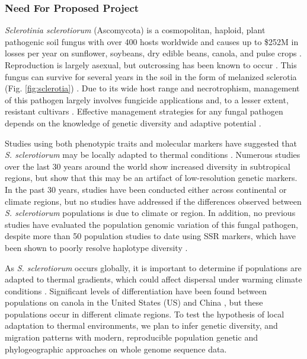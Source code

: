 \documentclass[12pt,letterpaper]{article}
\begin{document}
\subsubsection*{Need For Proposed Project}

\textit{Sclerotinia sclerotiorum} (Ascomycota) is a cosmopolitan, haploid, plant pathogenic soil fungus with over 400 hosts worldwide \citep{bolton2006sclerotinia} and causes up to \$252M in losses per year on sunflower, soybeans, dry edible beans, canola, and pulse crops \citep{uscanola}.
Reproduction is largely asexual, but outcrossing has been known to occur \citep{bolton2006sclerotinia,attanayake2014inferring}. 
This fungus can survive for several years in the soil in the form of melanized sclerotia (Fig. \ref{fig:sclerotia}) \citep{bolton2006sclerotinia}.
Due to its wide host range and necrotrophism, management of this pathogen largely involves fungicide applications and, to a lesser extent, resistant cultivars \citep{bolton2006sclerotinia}.
Effective management strategies for any fungal pathogen depends on the knowledge of genetic diversity and adaptive potential \citep{grunwald2016population}. 

Studies using both phenotypic traits and molecular markers have suggested that \textit{S. sclerotiorum} may be locally adapted to thermal conditions \citep{huang1991temperature,carbone2001microbial}.
Numerous studies over the last 30 years around the world show increased diversity in subtropical regions, but \citet{lehner2017sclerotinia} show that this may be an artifact of low-resolution genetic markers.
In the past 30 years, studies have been conducted either across continental or climate regions, but no studies have addressed if the differences observed between \textit{S. sclerotiorum} populations is due to climate or region.
In addition, no previous studies have evaluated the population genomic variation of this fungal pathogen, despite more than 50 population studies to date using SSR markers, which have been shown to poorly resolve haplotype diversity \citep{lehner2017independently}. 


As \textit{S. sclerotiorum} occurs globally, it is important to determine if populations are adapted to thermal gradients, which could affect dispersal under warming climate conditions \citep{bolton2006sclerotinia,lehner2017sclerotinia,croll2016genetic}.
Significant levels of differentiation have been found between populations on canola in the United States (US) and China \citep{attanayake2013sclerotinia}, but these populations occur in different climate regions.
To test the hypothesis of local adaptation to thermal environments, we plan to infer genetic diversity, and migration patterns with modern, reproducible population genetic and phylogeographic approaches on whole genome sequence data. 
\end{document}
